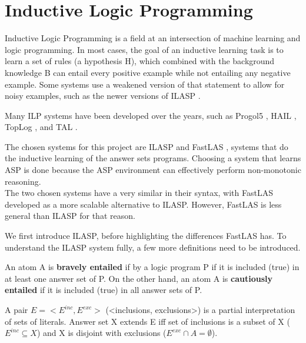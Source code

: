 
\section{Inductive Logic Programming}

Inductive Logic Programming \cite{RefWorks:RefID:42-muggleton1991inductive} is a field at an intersection of machine learning and logic programming.
In most cases, the goal of an inductive learning task is to learn a set of rules (a hypothesis H), which combined with the background knowledge B can entail every positive example while not entailing any negative example. 
Some systems use a weakened version of that statement to allow for noisy examples, such as the newer versions of ILASP \cite{RefWorks:RefID:55-law2018inductive}.

Many ILP systems have been developed over the years, such as Progol5 \cite{RefWorks:RefID:43-muggleton2000theory}, HAIL \cite{RefWorks:RefID:44-ray2003hybrid}, TopLog \cite{RefWorks:RefID:45-muggletontoplog:}, and TAL \cite{RefWorks:RefID:46-corapi2010inductive}.

The chosen systems for this project are ILASP \cite{RefWorks:RefID:18-law2020ilasp} and FastLAS \cite{RefWorks:RefID:19-law2020fastlas:}, systems that do the inductive learning of the answer sets programs.
Choosing a system that learns ASP is done because the ASP environment can effectively perform non-monotonic reasoning.\\

The two chosen systems have a very similar in their syntax, with FastLAS developed as a more scalable alternative to ILASP. 
However, FastLAS is less general than ILASP for that reason.

We first introduce ILASP, before highlighting the differences FastLAS has.
To understand the ILASP system fully, a few more definitions need to be introduced.

An atom A is \textbf{bravely entailed} if by a logic program P if it is included (true) in at least one answer set of P. 
On the other hand, an atom A is \textbf{cautiously entailed} if it is included (true) in all answer sets of P.

A pair $E = <E^{inc}, E^{exc}>$ (<inclusions, exclusions>) is a partial interpretation of sets of literals.
Answer set X extends E iff set of inclusions is a subset of X ($E^{inc} \subseteq X$) and X is disjoint with exclusions ($E^{exc} \cap A = \emptyset$).


